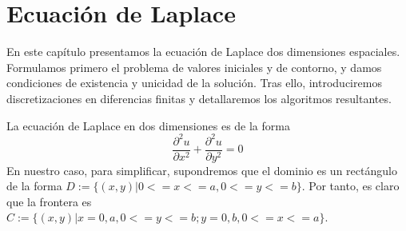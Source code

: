 \chapter{Ecuación de Laplace}
\label{cap:laplace}

\begin{resumen}
		En este capítulo presentamos la ecuación de Laplace dos dimensiones espaciales.
	Formulamos primero el problema de valores iniciales y de contorno, y damos condiciones de existencia y unicidad de la solución. Tras ello, introduciremos discretizaciones en diferencias finitas y detallaremos los algoritmos resultantes.
\end{resumen}

La ecuación de Laplace en dos dimensiones es de la forma
\begin{equation} \label{eq:laplace_eq}
	\frac{\partial^2u}{\partial x^2} + \frac{\partial^2u}{\partial y^2} = 0
\end{equation}
En nuestro caso, para simplificar, supondremos que el dominio es un rectángulo de la forma $D:=\{(x,y)|0<=x<=a, 0<=y<=b\}$. Por tanto, es claro que la frontera es $C:=\{(x,y)|x=0,a, 0<=y<=b;y=0,b, 0<=x<=a\}$.
